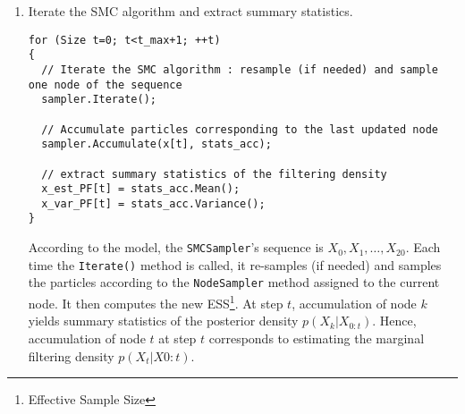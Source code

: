 \begin{enumerate}
 \item Iterate the SMC algorithm and extract summary statistics.
\begin{lstlisting}
for (Size t=0; t<t_max+1; ++t)
{
  // Iterate the SMC algorithm : resample (if needed) and sample one node of the sequence
  sampler.Iterate();

  // Accumulate particles corresponding to the last updated node
  sampler.Accumulate(x[t], stats_acc);

  // extract summary statistics of the filtering density
  x_est_PF[t] = stats_acc.Mean();
  x_var_PF[t] = stats_acc.Variance();
}
\end{lstlisting}
According to the model, the \texttt{SMCSampler}'s sequence is $X_0, X_1, \ldots, X_{20}$. Each time the \texttt{Iterate()} method is called, it re-samples (if needed) and samples the particles according to the \texttt{NodeSampler} method assigned to the current node. It then computes the new ESS\footnote{Effective Sample Size}. At step $t$, accumulation of node $k$ yields summary statistics of the posterior density $p(X_k|X_{0:t})$. Hence, accumulation of node $t$ at step $t$ corresponds to estimating the marginal filtering density $p(X_t|X{0:t})$.


\end{enumerate}